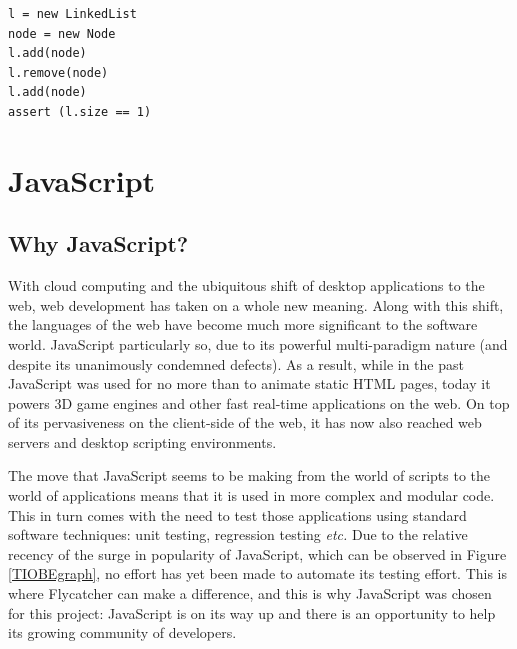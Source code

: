 \begin{lstlisting}
l = new LinkedList   
node = new Node
l.add(node)
l.remove(node)
l.add(node)
assert (l.size == 1)
\end{lstlisting}




\section{JavaScript}
\label{overalljs}
\subsection{Why JavaScript?}

With cloud computing and the ubiquitous shift of desktop applications to the web, web development has taken on a whole new meaning. Along with this shift, the languages of the web have become much more significant to the software world. JavaScript particularly so, due to its powerful multi-paradigm nature (and despite its unanimously condemned defects). As a result, while in the past JavaScript was used for no more than to animate static HTML pages, today it powers 3D game engines and other fast real-time applications on the web. On top of its pervasiveness on the client-side of the web, it has now also reached web servers and desktop scripting environments.

The move that JavaScript seems to be making from the world of scripts to the world of applications means that it is used in more complex and modular code. This in turn comes with the need to test those applications using standard software techniques: unit testing, regression testing \emph{etc.} Due to the relative recency of the surge in popularity of JavaScript, which can be observed in Figure \ref{TIOBEgraph}, no effort has yet been made to automate its testing effort. This is where \textsf{Flycatcher} can make a difference, and this is why JavaScript was chosen for this project: JavaScript is on its way up and there is an opportunity to help its growing community of developers.


